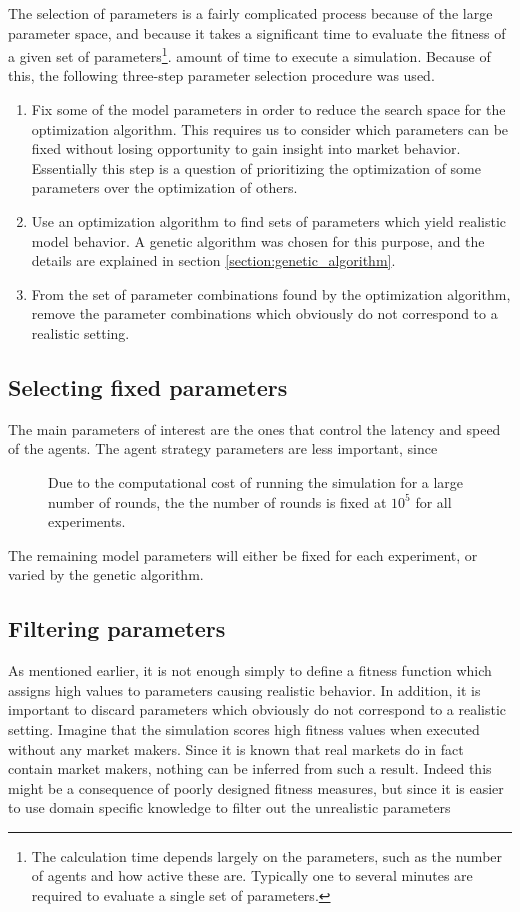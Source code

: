 The selection of parameters is a fairly complicated process because of the large parameter space, and because it takes a significant time to evaluate the fitness of a given set of parameters\footnote{The calculation time depends largely on the parameters, such as the number of agents and how active these are. Typically one to several minutes are required to evaluate a single set of parameters.}. amount of time to execute a simulation. Because of this, the following three-step parameter selection procedure was used.
\begin{enumerate}
	\item Fix some of the model parameters in order to reduce the search space for the optimization algorithm. This requires us to consider which parameters can be fixed without losing opportunity to gain insight into market behavior. Essentially this step is a question of prioritizing the optimization of some parameters over the optimization of others. 
	\item Use an optimization algorithm to find sets of parameters which yield realistic model behavior. A genetic algorithm was chosen for this purpose, and the details are explained in section \ref{section:genetic_algorithm}.
	\item From the set of parameter combinations found by the optimization algorithm, remove the parameter combinations which obviously do not correspond to a realistic setting.
\end{enumerate}

\subsection{Selecting fixed parameters}
The main parameters of interest are the ones that control the latency and speed of the agents. The agent strategy parameters are less important, since 

\begin{description}
	\item [\nrounds] Due to the computational cost of running the simulation for a large number of rounds, the the number of rounds is fixed at $10^5$ for all experiments.
\end{description}

The remaining model parameters will either be fixed for each experiment, or varied by the genetic algorithm. 

\subsection{Filtering parameters}\label{section:filtering_parameters}
As mentioned earlier, it is not enough simply to define a fitness function which assigns high values to parameters causing realistic behavior. In addition, it is important to discard parameters which obviously do not correspond to a realistic setting. Imagine that the simulation scores high fitness values when executed without any market makers. Since it is known that real markets do in fact contain market makers, nothing can be inferred from such a result. Indeed this might be a consequence of poorly designed fitness measures, but since it is easier to use domain specific knowledge to filter out the unrealistic parameters

